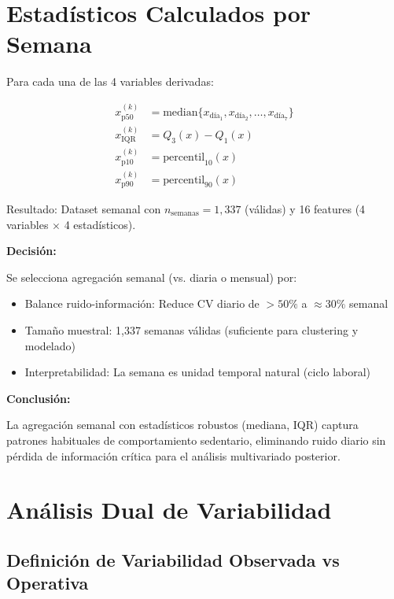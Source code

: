 \documentclass[12pt,letterpaper,twoside]{report}
\begin{document}
\begin{calculobox}
\section{Estadísticos Calculados por Semana}

Para cada una de las 4 variables derivadas:

\begin{align}
x^{(k)}_{\text{p50}} &= \text{median}\{x_{\text{día}_1}, x_{\text{día}_2}, \ldots, x_{\text{día}_7}\} \\
x^{(k)}_{\text{IQR}} &= Q_3(x) - Q_1(x) \\
x^{(k)}_{\text{p10}} &= \text{percentil}_{10}(x) \\
x^{(k)}_{\text{p90}} &= \text{percentil}_{90}(x)
\end{align}

Resultado: Dataset semanal con $n_{\text{semanas}}=1,337$ (válidas) y 16 features (4 variables $\times$ 4 estadísticos).

\begin{decisionbox}
\textbf{Decisión:}

Se selecciona agregación semanal (vs. diaria o mensual) por:
\begin{itemize}[noitemsep]
    \item Balance ruido-información: Reduce CV diario de $> 50\%$ a $\approx 30\%$ semanal
    \item Tamaño muestral: 1,337 semanas válidas (suficiente para clustering y modelado)
    \item Interpretabilidad: La semana es unidad temporal natural (ciclo laboral)
\end{itemize}
\end{decisionbox}

\begin{conclusionbox}
\textbf{Conclusión:}

La agregación semanal con estadísticos robustos (mediana, IQR) captura patrones habituales de comportamiento sedentario, eliminando ruido diario sin pérdida de información crítica para el análisis multivariado posterior.
\end{conclusionbox}

\section{Análisis Dual de Variabilidad}

\subsection{Definición de Variabilidad Observada vs Operativa}


\end{calculobox}
\end{document}
